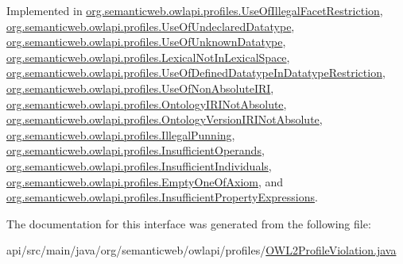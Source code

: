 Implemented in \hyperlink{classorg_1_1semanticweb_1_1owlapi_1_1profiles_1_1_use_of_illegal_facet_restriction_a869ecf848fc128e43ede4614af1e9849}{org.\-semanticweb.\-owlapi.\-profiles.\-Use\-Of\-Illegal\-Facet\-Restriction}, \hyperlink{classorg_1_1semanticweb_1_1owlapi_1_1profiles_1_1_use_of_undeclared_datatype_a777dab1096875c243192e14e62eeb1b9}{org.\-semanticweb.\-owlapi.\-profiles.\-Use\-Of\-Undeclared\-Datatype}, \hyperlink{classorg_1_1semanticweb_1_1owlapi_1_1profiles_1_1_use_of_unknown_datatype_aa2c5a1efe0d417fd889ff2b7992880ac}{org.\-semanticweb.\-owlapi.\-profiles.\-Use\-Of\-Unknown\-Datatype}, \hyperlink{classorg_1_1semanticweb_1_1owlapi_1_1profiles_1_1_lexical_not_in_lexical_space_a8b102d22a445e3e32e139a2e1b5349de}{org.\-semanticweb.\-owlapi.\-profiles.\-Lexical\-Not\-In\-Lexical\-Space}, \hyperlink{classorg_1_1semanticweb_1_1owlapi_1_1profiles_1_1_use_of_defined_datatype_in_datatype_restriction_a28632e3cf20cd582ab01f6e5fc75a482}{org.\-semanticweb.\-owlapi.\-profiles.\-Use\-Of\-Defined\-Datatype\-In\-Datatype\-Restriction}, \hyperlink{classorg_1_1semanticweb_1_1owlapi_1_1profiles_1_1_use_of_non_absolute_i_r_i_ac6ee7c86342d1b35fcb4b184cd10e528}{org.\-semanticweb.\-owlapi.\-profiles.\-Use\-Of\-Non\-Absolute\-I\-R\-I}, \hyperlink{classorg_1_1semanticweb_1_1owlapi_1_1profiles_1_1_ontology_i_r_i_not_absolute_af6830a79ba59e600f6646f1b4f21d599}{org.\-semanticweb.\-owlapi.\-profiles.\-Ontology\-I\-R\-I\-Not\-Absolute}, \hyperlink{classorg_1_1semanticweb_1_1owlapi_1_1profiles_1_1_ontology_version_i_r_i_not_absolute_a1aabbb3087a21ba0886c5a16086c08a2}{org.\-semanticweb.\-owlapi.\-profiles.\-Ontology\-Version\-I\-R\-I\-Not\-Absolute}, \hyperlink{classorg_1_1semanticweb_1_1owlapi_1_1profiles_1_1_illegal_punning_a5ba8fef5a918e3d0a2b9da34d430d66d}{org.\-semanticweb.\-owlapi.\-profiles.\-Illegal\-Punning}, \hyperlink{classorg_1_1semanticweb_1_1owlapi_1_1profiles_1_1_insufficient_operands_a8e1ed1303772a5acbbd980f246b0999a}{org.\-semanticweb.\-owlapi.\-profiles.\-Insufficient\-Operands}, \hyperlink{classorg_1_1semanticweb_1_1owlapi_1_1profiles_1_1_insufficient_individuals_a798ed90604673b31af6f1383c77a31a4}{org.\-semanticweb.\-owlapi.\-profiles.\-Insufficient\-Individuals}, \hyperlink{classorg_1_1semanticweb_1_1owlapi_1_1profiles_1_1_empty_one_of_axiom_acdb9029502afd4e0bcc85142c4a03ef5}{org.\-semanticweb.\-owlapi.\-profiles.\-Empty\-One\-Of\-Axiom}, and \hyperlink{classorg_1_1semanticweb_1_1owlapi_1_1profiles_1_1_insufficient_property_expressions_a84b451fef2397f211e2b8fb95695edcb}{org.\-semanticweb.\-owlapi.\-profiles.\-Insufficient\-Property\-Expressions}.



The documentation for this interface was generated from the following file\-:\begin{DoxyCompactItemize}
\item 
api/src/main/java/org/semanticweb/owlapi/profiles/\hyperlink{_o_w_l2_profile_violation_8java}{O\-W\-L2\-Profile\-Violation.\-java}\end{DoxyCompactItemize}

